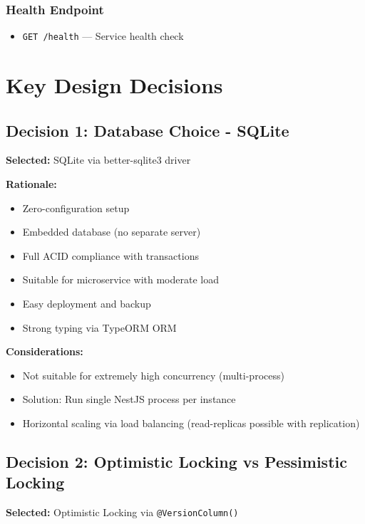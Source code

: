\documentclass[12pt,a4paper]{article}
\begin{document}
\subsubsection{Health Endpoint}

\begin{itemize}
    \item \texttt{GET /health} — Service health check
\end{itemize}

\newpage

\section{Key Design Decisions}

\subsection{Decision 1: Database Choice - SQLite}

\textbf{Selected:} SQLite via better-sqlite3 driver

\textbf{Rationale:}
\begin{itemize}
    \item Zero-configuration setup
    \item Embedded database (no separate server)
    \item Full ACID compliance with transactions
    \item Suitable for microservice with moderate load
    \item Easy deployment and backup
    \item Strong typing via TypeORM ORM
\end{itemize}

\textbf{Considerations:}
\begin{itemize}
    \item Not suitable for extremely high concurrency (multi-process)
    \item Solution: Run single NestJS process per instance
    \item Horizontal scaling via load balancing (read-replicas possible with replication)
\end{itemize}

\subsection{Decision 2: Optimistic Locking vs Pessimistic Locking}

\textbf{Selected:} Optimistic Locking via \texttt{@VersionColumn()}
\end{document}
